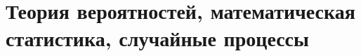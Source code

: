 \documentclass[../../book-ru.tex]{subfiles}
\begin{document}
\chapter{Теория вероятностей, математическая статистика, случайные процессы}
\label{ch:1.2-probability-stats-ru}














\end{document}
